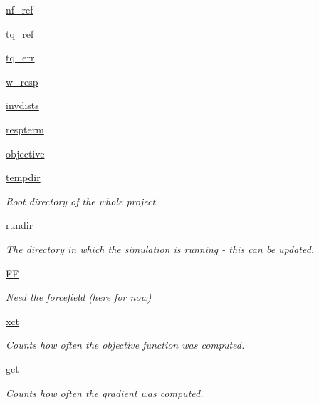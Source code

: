 \begin{DoxyCompactItemize}
\hyperlink{classforcebalance_1_1abinitio_1_1AbInitio_a5a77f4b99a5b01245ab0435d632122a1}{nf\-\_\-ref}
\item 
\hyperlink{classforcebalance_1_1abinitio_1_1AbInitio_aadda7244869b583a4533317615c421e1}{tq\-\_\-ref}
\item 
\hyperlink{classforcebalance_1_1abinitio_1_1AbInitio_ae60e834d5b5bf13f8fb70d403a97db28}{tq\-\_\-err}
\item 
\hyperlink{classforcebalance_1_1abinitio_1_1AbInitio_a176a442bd340d2f9b54319e76feb46ae}{w\-\_\-resp}
\item 
\hyperlink{classforcebalance_1_1abinitio_1_1AbInitio_aa01ee600ba0f429ffc81135af9d8109b}{invdists}
\item 
\hyperlink{classforcebalance_1_1abinitio_1_1AbInitio_a689e3849518b33539442a473a41ed32d}{respterm}
\item 
\hyperlink{classforcebalance_1_1abinitio_1_1AbInitio_acbbd447b9f66bc4699992f3b64bb256d}{objective}
\item 
\hyperlink{classforcebalance_1_1target_1_1Target_aa1f01b5b78db253b5b66384ed11ed193}{tempdir}
\begin{DoxyCompactList}\small\item\em Root directory of the whole project. \end{DoxyCompactList}\item 
\hyperlink{classforcebalance_1_1target_1_1Target_a6872de5b2d4273b82336ea5b0da29c9e}{rundir}
\begin{DoxyCompactList}\small\item\em The directory in which the simulation is running -\/ this can be updated. \end{DoxyCompactList}\item 
\hyperlink{classforcebalance_1_1target_1_1Target_a38a37919783141ea37fdcf8b00ce0aaf}{F\-F}
\begin{DoxyCompactList}\small\item\em Need the forcefield (here for now) \end{DoxyCompactList}\item 
\hyperlink{classforcebalance_1_1target_1_1Target_aad2e385cfbf7b4a68f1c2cb41133fe82}{xct}
\begin{DoxyCompactList}\small\item\em Counts how often the objective function was computed. \end{DoxyCompactList}\item 
\hyperlink{classforcebalance_1_1target_1_1Target_aa625ac88c6744eb14ef281d9496d0dbb}{gct}
\begin{DoxyCompactList}\small\item\em Counts how often the gradient was computed. \end{DoxyCompactList}\item 

\end{DoxyCompactItemize}
